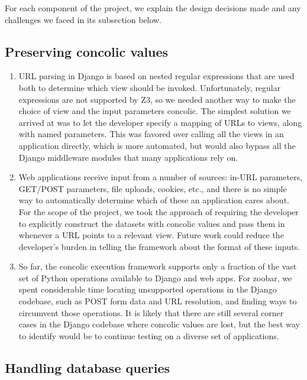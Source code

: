 \documentclass{scrartcl}
\begin{document}
For each component of the project, we explain the design decisions
made and any challenges we faced in its subsection below.

\subsection{Preserving concolic values}

\begin{enumerate}
\item URL parsing in Django is based on nested regular expressions
  that are used both to determine which view should be invoked.
  Unfortunately, regular expressions are not supported by Z3, so we
  needed another way to make the choice of view and the input
  parameters concolic. The simplest solution we arrived at was to
  let the developer specify a mapping of URLs to views, along with
  named parameters. This was favored over calling all the views in an
  application directly, which is more automated, but would also
  bypass all the Django middleware modules that many applications
  rely on.

\item Web applications receive input from a number of sources: in-URL
  parameters, GET/POST parameters, file uploads, cookies, etc., and
  there is no simple way to automatically determine which of these an
  application cares about. For the scope of the project, we took the
  approach of requiring the developer to explicitly construct the
  datasets with concolic values and pass them in whenever a URL points
  to a relevant view. Future work could reduce the developer's burden
  in telling the framework about the format of these inputs.

\item So far, the concolic execution framework supports only a
  fraction of the vast set of Python operations available to Django
  and web apps. For zoobar, we spent considerable time locating
  unsupported operations in the Django codebase, such as POST form
  data and URL resolution, and finding ways to circumvent those
  operations. It is likely that there are still several corner cases
  in the Django codebase where concolic values are lost, but the best
  way to identify would be to continue testing on a diverse set of
  applications.
\end{enumerate}

\subsection{Handling database queries}
\end{document}
